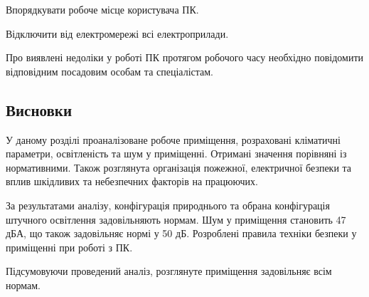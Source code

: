     Впорядкувати робоче місце користувача ПК.

    Відключити від електромережі всі електроприлади.

    Про виявлені недоліки у роботі ПК протягом робочого часу необхідно повідомити відповідним посадовим
    особам та спеціалістам.

\subsection{Висновки}

    У даному розділі проаналізоване робоче приміщення, розраховані кліматичні параметри, освітленість та шум у приміщенні. Отримані значення порівняні із нормативними. Також розглянута організація пожежної, електричної безпеки та вплив шкідливих та небезпечних факторів на працюючих.

    За результатами аналізу, конфігурація природнього та обрана конфігурація штучного освітлення задовільняють нормам.
    Шум у приміщення становить 47 дБА, що також задовільняє нормі у 50 дБ.
    Розроблені правила техніки безпеки у приміщенні при роботі з ПК.

    Підсумовуючи проведений аналіз, розглянуте приміщення задовільняє всім нормам.
